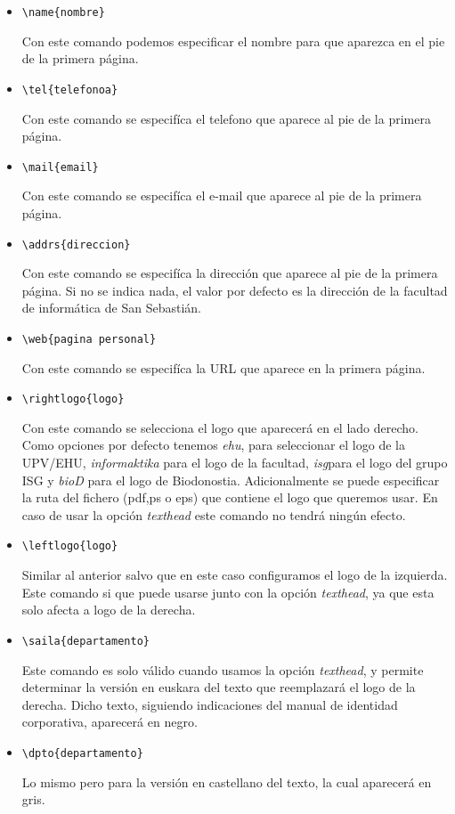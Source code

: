 \documentclass[es]{ifreport}
\begin{document}
\begin{itemize}
\item \begin{verbatim}\name{nombre}\end{verbatim} Con este comando podemos especificar el nombre para que aparezca en el pie de la primera p\'agina.\item \begin{verbatim}\tel{telefonoa}\end{verbatim} Con este comando se especif\'ica el telefono que aparece al pie de la primera p\'agina.
\item \begin{verbatim}\mail{email}\end{verbatim} Con este comando se especif\'ica el e-mail que aparece al pie de la primera p\'agina.
\item \begin{verbatim}\addrs{direccion}\end{verbatim} Con este comando se especif\'ica la direcci\'on que aparece al pie de la primera p\'agina. Si no se indica nada, el valor por defecto es la direcci\'on de la facultad de inform\'atica de San Sebasti\'an.
\item \begin{verbatim}\web{pagina personal}\end{verbatim} Con este comando se especif\'ica la URL que aparece en la primera p\'agina.
\item \begin{verbatim}\rightlogo{logo}\end{verbatim} Con este comando se selecciona el logo que aparecer\'a en el lado derecho. Como opciones por defecto tenemos \textit{ehu}, para seleccionar el logo de la UPV/EHU, \textit{informaktika} para el logo de la facultad, \textit{isg}para el logo del grupo ISG y \textit{bioD} para el logo de Biodonostia. Adicionalmente se puede especificar la ruta del fichero (pdf,ps o eps) que contiene el logo que queremos usar. En caso de usar la opci\'on \textit{texthead} este comando no tendr\'a ning\'un efecto.
\item \begin{verbatim}\leftlogo{logo}\end{verbatim} Similar al anterior salvo que en este caso configuramos el logo de la izquierda. Este comando si que puede usarse junto con la opci\'on \textit{texthead}, ya que esta solo afecta a logo de la derecha.
\item \begin{verbatim}\saila{departamento}\end{verbatim} Este comando es solo v\'alido cuando usamos la opci\'on \textit{texthead}, y permite determinar la versi\'on en euskara del texto que reemplazar\'a el logo de la derecha. Dicho texto, siguiendo indicaciones del manual de identidad corporativa, aparecer\'a en negro.
\item \begin{verbatim}\dpto{departamento}\end{verbatim} Lo mismo pero para la versi\'on en castellano del texto, la cual aparecer\'a en gris.
\end{itemize}
\end{document}

